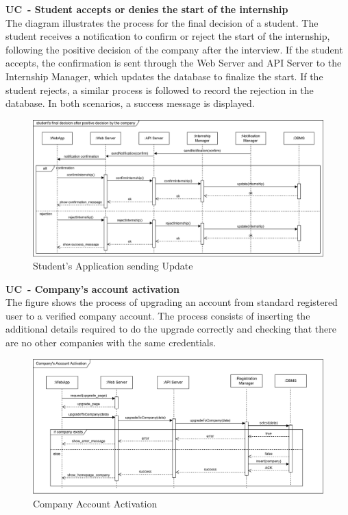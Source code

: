 \textbf{UC\cuc\ - Student accepts or denies the start of the internship} \\
The diagram illustrates the process for the final decision of a student. The student receives a notification to confirm or reject the start of the internship, following the positive decision of the company after the interview. If the student accepts, the confirmation is sent through the Web Server and API Server to the Internship Manager, which updates the database to finalize the start. If the student rejects, a similar process is followed to record the rejection in the database. In both scenarios, a success message is displayed.
\begin{center}
    \begin{figure}[H]
        \centering
        \includegraphics[width=1\linewidth]{Images/Sequence diagrams/UC9.png}
        \caption{Student's Application sending Update}
        \label{fig:enter-label}
    \end{figure}
\end{center}

\textbf{UC\cuc\  - Company’s account activation} \\
The figure shows the process of upgrading an account from standard registered user to a verified company account. The process consists of inserting the additional details required to do the upgrade correctly and checking that there are no other companies with the same credentials.
\begin{center}
    \begin{figure}[H]
        \centering
        \includegraphics[width=1\linewidth]{Images/Sequence diagrams/UC10.png}
        \caption{Company Account Activation}
        \label{fig:enter-label}
    \end{figure}
\end{center}


